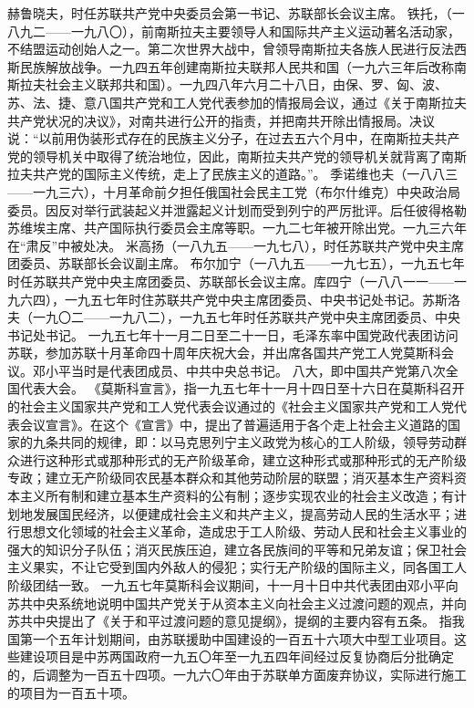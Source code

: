 \begin{maonote}
赫鲁晓夫，时任苏联共产党中央委员会第一书记、苏联部长会议主席。
铁托，（一八九二——一九八〇），前南斯拉夫主要领导人和国际共产主义运动著名活动家，不结盟运动创始人之一。第二次世界大战中，曾领导南斯拉夫各族人民进行反法西斯民族解放战争。一九四五年创建南斯拉夫联邦人民共和国（一九六三年后改称南斯拉夫社会主义联邦共和国）。一九四八年六月二十八日，由保、罗、匈、波、苏、法、捷、意八国共产党和工人党代表参加的情报局会议，通过《关于南斯拉夫共产党状况的决议》，对南共进行公开的指责，并把南共开除出情报局。决议说：“以前用伪装形式存在的民族主义分子，在过去五六个月中，在南斯拉夫共产党的领导机关中取得了统治地位，因此，南斯拉夫共产党的领导机关就背离了南斯拉夫共产党的国际主义传统，走上了民族主义的道路。”。
季诺维也夫（一八八三——一九三六），十月革命前夕担任俄国社会民主工党（布尔什维克）中央政治局委员。因反对举行武装起义并泄露起义计划而受到列宁的严厉批评。后任彼得格勒苏维埃主席、共产国际执行委员会主席等职。一九二七年被开除出党。一九三六年在“肃反”中被处决。
米高扬（一八九五——一九七八），时任苏联共产党中央主席团委员、苏联部长会议副主席。
布尔加宁（一八九五——一九七五），一九五七年时任苏联共产党中央主席团委员、苏联部长会议主席。库四宁（一八八一一——一九六四），一九五七年时住苏联共产党中央主席团委员、中央书记处书记。苏斯洛夫（一九〇二——一九八二），一九五七年时任苏联共产党中央主席团委员、中央书记处书记。
一九五七年十一月二日至二十一日，毛泽东率中国党政代表团访问苏联，参加苏联十月革命四十周年庆祝大会，并出席各国共产党工人党莫斯科会议。邓小平当时是代表团成员、中共中央总书记。
八大，即中国共产党第八次全国代表大会。
《莫斯科宣言》，指一九五七年十一月十四日至十六日在莫斯科召开的社会主义国家共产党和工人党代表会议通过的《社会主义国家共产党和工人党代表会议宣言》。在这个《宣言》中，提出了普遍适用于各个走上社会主义道路的国家的九条共同的规律，即：以马克思列宁主义政党为核心的工人阶级，领导劳动群众进行这种形式或那种形式的无产阶级革命，建立这种形式或那种形式的无产阶级专政；建立无产阶级同农民基本群众和其他劳动阶层的联盟；消灭基本生产资料资本主义所有制和建立基本生产资料的公有制；逐步实现农业的社会主义改造；有计划地发展国民经济，以便建成社会主义和共产主义，提高劳动人民的生活水平；进行思想文化领域的社会主义革命，造成忠于工人阶级、劳动人民和社会主义事业的强大的知识分子队伍；消灭民族压迫，建立各民族间的平等和兄弟友谊；保卫社会主义果实，不让它受到国内外敌人的侵犯；实行无产阶级的国际主义，同各国工人阶级团结一致。
一九五七年莫斯科会议期间，十一月十日中共代表团由邓小平向苏共中央系统地说明中国共产党关于从资本主义向社会主义过渡问题的观点，并向苏共中央提出了《关于和平过渡问题的意见提纲》，提纲的主要内容有五条。
指我国第一个五年计划期间，由苏联援助中国建设的一百五十六项大中型工业项目。这些建设项目是中苏两国政府一九五〇年至一九五四年间经过反复协商后分批确定的，后调整为一百五十四项。一九六〇年由于苏联单方面废弃协议，实际进行施工的项目为一百五十项。

\end{maonote}
